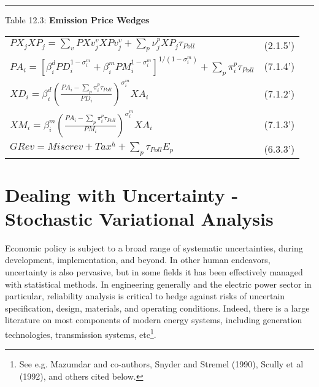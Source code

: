 \documentclass{article}
\begin{document}
\newpage
\noindent\rule{\linewidth}{0.4pt}
\begin{center}
\begin{large}
{\centering Table 12.3: \textbf{Emission Price Wedges} \par}

\begin{tabular}{>{\raggedright}p{} l}


$PX_jXP_j = \displaystyle \sum_v PXv^v_j XPv^v_j + \sum_p \nu^p_j XP_j \tau_{Poll}$ & (2.1.5') \\[15pt]

{\small$PA_i = \left[\beta^d_i PD^{1-{\sigma^m_i}}_i + \beta^m_i PM^{1 - {\sigma^m_i}}_i \right]^{1/(1-{\sigma^m_i})} + \displaystyle \sum_p \pi^p_i \tau_{Poll}$} & (7.1.4') \\[15pt]

$XD_i = \beta^d_i \left(\frac{PA_i - \displaystyle \sum_p \pi^p_i \tau_{Poll}}{PD_i} \right)^{\sigma^m_i} XA_i$ & (7.1.2') \\[15pt]

$XM_i = \beta^m_i \left(\frac{PA_i - \displaystyle \sum_p \pi^p_i \tau_{Poll}}{PM_i} \right)^{\sigma^m_i} XA_i$ & (7.1.3') \\[15pt]

$GRev = Miscrev + Tax^h + \displaystyle \sum_p \tau_{Poll} E_p$ & (6.3.3') \\[20pt]

\hline
\end{tabular}
\end{large}
\end{center}

\section{Dealing with Uncertainty - Stochastic Variational Analysis}

Economic policy is subject to a broad range of systematic uncertainties, during development, implementation, and beyond. In other human endeavors, uncertainty is also pervasive, but in some fields it has been effectively managed with statistical methods. In engineering generally and the electric power sector in particular, reliability analysis is critical to hedge against risks of uncertain specification, design, materials, and operating conditions. Indeed, there is a large literature on most components of modern energy systems, including generation technologies, transmission systems, etc\footnote{ See e.g. Mazumdar and co-authors, Snyder and Stremel (1990), Scully et al (1992), and others cited below.}. 
\end{document}
